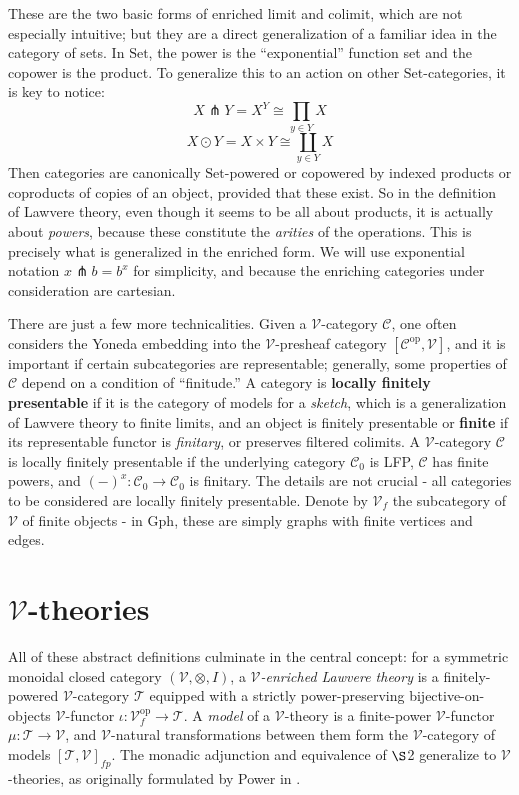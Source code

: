 \documentclass[a4paper,UKenglish]{article}
\theoremstyle{definition}
\newcommand{\Gph}{\mathrm{Gph}}
\newcommand{\Set}{\mathrm{Set}}
\newcommand{\op}{\mathrm{op}}
\newcommand{\V}{\mathscr{V}}
\newcommand{\C}{\mathscr{C}}
\newcommand{\T}{\mathscr{T}}
\newcommand{\pfk}{\pitchfork}
\begin{document}
These are the two basic forms of enriched limit and colimit, which are not especially intuitive; but they are a direct generalization of a familiar idea in the category of sets. In $\Set$, the power is the ``exponential'' function set and the copower is the product. To generalize this to an action on other $\Set$-categories, it is key to notice: $$X \pfk Y = X^Y \cong \prod_{y\in Y}X$$ $$X \odot Y = X \times Y \cong \coprod_{y\in Y}X$$ Then categories are canonically $\Set$-powered or copowered by indexed products or coproducts of copies of an object, provided that these exist. So in the definition of Lawvere theory, even though it seems to be all about products, it is actually about \textit{powers}, because these constitute the \textit{arities} of the operations. This is precisely what is generalized in the enriched form. We will use exponential notation $x\pfk b = b^x$ for simplicity, and because the enriching categories under consideration are cartesian.

There are just a few more technicalities. Given a $\V$-category $\C$, one often considers the Yoneda embedding into the $\V$-presheaf category $[\C^\op, \V]$, and it is important if certain subcategories are representable; generally, some properties of $\C$ depend on a condition of ``finitude.'' \cite{finite} A category is \textbf{locally finitely presentable} if it is the category of models for a \textit{sketch}, which is a generalization of Lawvere theory to finite limits, and an object is finitely presentable or \textbf{finite} if its representable functor is \textit{finitary}, or preserves filtered colimits. A $\V$-category $\C$ is locally finitely presentable if the underlying category $\C_0$ is LFP, $\C$ has finite powers, and $(-)^x: \C_0 \to \C_0$ is finitary. The details are not crucial - all categories to be considered are locally finitely presentable. Denote by $\V_f$ the subcategory of $\V$ of finite objects - in $\Gph$, these are simply graphs with finite vertices and edges.\\

\section{$\V$-theories}
All of these abstract definitions culminate in the central concept: for a symmetric monoidal closed category $(\V,\otimes,I)$, a \textit{$\V$-enriched Lawvere theory} is a finitely-powered $\V$-category $\T$ equipped with a strictly power-preserving bijective-on-objects $\V$-functor $\iota:\V_f^\op \to \T$. A \textit{model} of a $\V$-theory is a finite-power $\V$-functor $\mu:\T \to \V$, and $\V$-natural transformations between them form the $\V$-category of models $[\T,\V]_{fp}$. The monadic adjunction and equivalence of $\S$2 generalize to $\V$-theories, as originally formulated by Power in \cite{power}.
\end{document}
